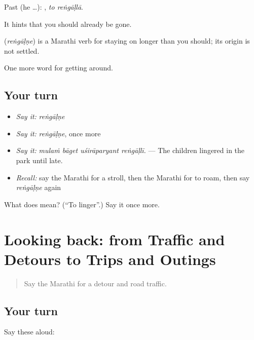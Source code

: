 Past (he …):  , \emph{to reṅgāḷlā}.

It hints that you should already be gone.

\begin{cousinweb}
\textbf{} (\emph{reṅgāḷṇe}) is a Marathi verb for staying on longer than you should; its origin is not settled.
\end{cousinweb}

\begin{grammarlens}[title={What you've built}]
One more word for getting around.
\end{grammarlens}

\subsection*{Your turn}
\begin{itemize}
\raggedright
  \item \emph{Say it:} \emph{reṅgāḷṇe}
  \item \emph{Say it:} \emph{reṅgāḷṇe}, once more
  \item \emph{Say it:} \emph{mulaṁ bāget uśirāparyant reṅgāḷlī.} — The children lingered in the park until late.
  \item \emph{Recall:} say the Marathi for a stroll, then the Marathi for to roam, then say \emph{reṅgāḷṇe} again
\end{itemize}

\begin{tcolorbox}[breakable,colback=teal!4,colframe=teal!35!black,title={Before you move on}]
What does  mean? (\textquotedblleft{}To linger\textquotedblright{}.) Say it once more.
\end{tcolorbox}
\section[(dialogue)]{Looking back: from Traffic and Detours to Trips and Outings}

\label{lesson:MR-R411-review-404-411}



\begin{quote}
Say the Marathi for a detour and road traffic.
\end{quote}

\subsection*{Your turn}
Say these aloud:

